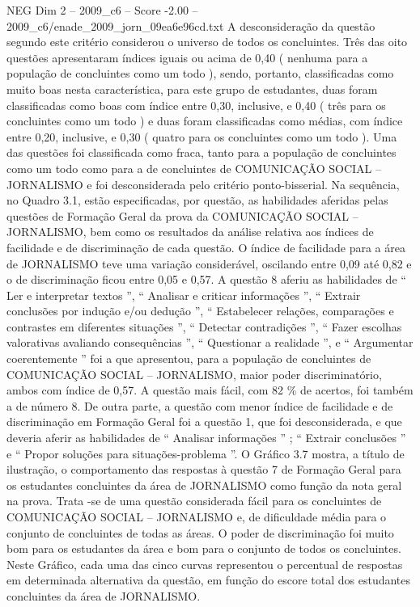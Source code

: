 \begin{textsample}{NEG Dim 2 – 2009\_c6 – Score -2.00 – 2009\_c6/enade\_2009\_jorn\_09ea6e96cd.txt}
A desconsideração da questão segundo este critério considerou o universo de todos os concluintes.
Três das oito questões apresentaram índices iguais ou acima de 0,40 ( nenhuma para a população de concluintes como um todo ), sendo, portanto, classificadas como muito boas nesta característica, para este grupo de estudantes, duas foram classificadas como boas com índice entre 0,30, inclusive, e 0,40 ( três para os concluintes como um todo ) e duas foram classificadas como médias, com índice entre 0,20, inclusive, e 0,30 ( quatro para os concluintes como um todo ).
Uma das questões foi classificada como fraca, tanto para a população de concluintes como um todo como para a de concluintes de COMUNICAÇÃO SOCIAL – JORNALISMO e foi desconsiderada pelo critério ponto-bisserial.
Na sequência, no Quadro 3.1, estão especificadas, por questão, as habilidades aferidas pelas questões de Formação Geral da prova da COMUNICAÇÃO SOCIAL – JORNALISMO, bem como os resultados da análise relativa aos índices de facilidade e de discriminação de cada questão.
O índice de facilidade para a área de JORNALISMO teve uma variação considerável, oscilando entre 0,09 até 0,82 e o de discriminação ficou entre 0,05 e 0,57.
A questão 8 aferiu as habilidades de “ Ler e interpretar textos ”, “ Analisar e criticar informações ”, “ Extrair conclusões por indução e/ou dedução ”, “ Estabelecer relações, comparações e contrastes em diferentes situações ”, “ Detectar contradições ”, “ Fazer escolhas valorativas avaliando consequências ”, “ Questionar a realidade ”, e “ Argumentar coerentemente ” foi a que apresentou, para a população de concluintes de COMUNICAÇÃO SOCIAL – JORNALISMO, maior poder discriminatório, ambos com índice de 0,57.
A questão mais fácil, com 82 \% de acertos, foi também a de número 8.
De outra parte, a questão com menor índice de facilidade e de discriminação em Formação Geral foi a questão 1, que foi desconsiderada, e que deveria aferir as habilidades de “ Analisar informações ” ; “ Extrair conclusões ” e “ Propor soluções para situações-problema ”.
O Gráfico 3.7 mostra, a título de ilustração, o comportamento das respostas à questão 7 de Formação Geral para os estudantes concluintes da área de JORNALISMO como função da nota geral na prova.
Trata -se de uma questão considerada fácil para os concluintes de COMUNICAÇÃO SOCIAL – JORNALISMO e, de dificuldade média para o conjunto de concluintes de todas as áreas.
O poder de discriminação foi muito bom para os estudantes da área e bom para o conjunto de todos os concluintes.
Neste Gráfico, cada uma das cinco curvas representou o percentual de respostas em determinada alternativa da questão, em função do escore total dos estudantes concluintes da área de JORNALISMO.

\end{textsample}
